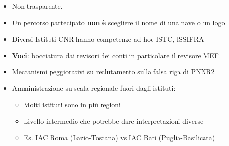 \documentclass[
  letterpaper,
  DIV=11,
  numbers=noendperiod]{scrartcl}
\providecommand{\tightlist}{%
  \setlength{\itemsep}{0pt}\setlength{\parskip}{0pt}}\usepackage{longtable,booktabs,array}
\begin{document}
\begin{itemize}
\item
  Non trasparente.
\item
  Un percorso partecipato \textbf{non è} scegliere il nome di una nave o
  un logo
\item
  Diversi Istituti CNR hanno competenze ad hoc
  \href{https://www.istc.cnr.it/en/content/manuale-di-progettazione-partecipata-con-i-bambini-e-le-bambine}{ISTC},
  \href{https://www.issirfa.cnr.it/attivita-di-ricerca/progetti-conclusi/progetto-percorsi/}{ISSIFRA}
\item
  \textbf{Voci}: bocciatura dai revisori dei conti in particolare il
  revisore MEF
\item
  Meccanismi peggiorativi su reclutamento sulla falsa riga di PNNR2
\item
  Amministrazione su scala regionale fuori dagli istituti:

  \begin{itemize}
  \tightlist
  \item
    Molti istituti sono in più regioni
  \item
    Livello intermedio che potrebbe dare interpretazioni diverse
  \item
    Es. IAC Roma (Lazio-Toscana) vs IAC Bari (Puglia-Basilicata)
  \end{itemize}
\end{itemize}
\end{document}
